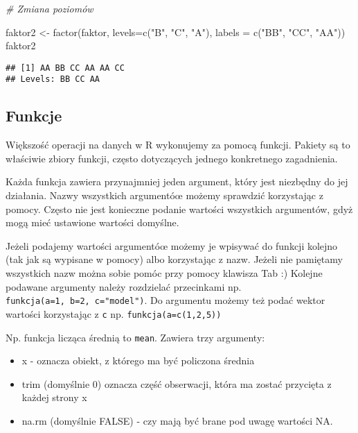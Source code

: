 \documentclass[
]{book}
\newenvironment{Shaded}{\begin{snugshade}}{\end{snugshade}}
\newcommand{\AttributeTok}[1]{\textcolor[rgb]{0.77,0.63,0.00}{#1}}
\newcommand{\CommentTok}[1]{\textcolor[rgb]{0.56,0.35,0.01}{\textit{#1}}}
\newcommand{\FunctionTok}[1]{\textcolor[rgb]{0.00,0.00,0.00}{#1}}
\newcommand{\NormalTok}[1]{#1}
\newcommand{\OtherTok}[1]{\textcolor[rgb]{0.56,0.35,0.01}{#1}}
\newcommand{\StringTok}[1]{\textcolor[rgb]{0.31,0.60,0.02}{#1}}
\begin{document}
\begin{Shaded}
\begin{Highlighting}[]
\CommentTok{\# Zmiana poziomów}

\NormalTok{faktor2 }\OtherTok{\textless{}{-}} \FunctionTok{factor}\NormalTok{(faktor, }\AttributeTok{levels=}\FunctionTok{c}\NormalTok{(}\StringTok{"B"}\NormalTok{, }\StringTok{"C"}\NormalTok{, }\StringTok{"A"}\NormalTok{), }\AttributeTok{labels =} \FunctionTok{c}\NormalTok{(}\StringTok{"BB"}\NormalTok{, }\StringTok{"CC"}\NormalTok{, }\StringTok{"AA"}\NormalTok{))}
\NormalTok{faktor2}
\end{Highlighting}
\end{Shaded}

\begin{verbatim}
## [1] AA BB CC AA AA CC
## Levels: BB CC AA
\end{verbatim}

\hypertarget{funkcje}{%
\subsection{Funkcje}\label{funkcje}}

Większość operacji na danych w R wykonujemy za pomocą funkcji. Pakiety są to właściwie zbiory funkcji, często dotyczących jednego konkretnego zagadnienia.

Każda funkcja zawiera przynajmniej jeden argument, który jest niezbędny do jej działania. Nazwy wszystkich argumentóœ możemy sprawdzić korzystając z pomocy. Często nie jest konieczne podanie wartości wszystkich argumentów, gdyż mogą mieć ustawione wartości domyślne.

Jeżeli podajemy wartości argumentóœ możemy je wpisywać do funkcji kolejno (tak jak są wypisane w pomocy) albo korzystając z nazw. Jeżeli nie pamiętamy wszystkich nazw można sobie pomóc przy pomocy klawisza Tab :) Kolejne podawane argumenty należy rozdzielać przecinkami np. \texttt{funkcja(a=1,\ b=2,\ c="model")}. Do argumentu możemy też podać wektor wartości korzystając z \texttt{c} np. \texttt{funkcja(a=c(1,2,5))}

Np. funkcja licząca średnią to \texttt{mean}. Zawiera trzy argumenty:

\begin{itemize}
\item
  x - oznacza obiekt, z którego ma być policzona średnia
\item
  trim (domyślnie 0) oznacza część obserwacji, która ma zostać przycięta z każdej strony x
\item
  na.rm (domyślnie FALSE) - czy mają być brane pod uwagę wartości NA.
\end{itemize}
\end{document}
